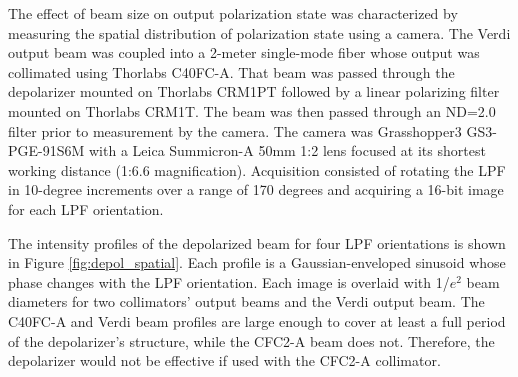 The effect of beam size on output polarization state was characterized by measuring the spatial distribution of polarization state using a camera. The Verdi output beam was coupled into a 2-meter single-mode fiber whose output was collimated using Thorlabs C40FC-A. That beam was passed through the depolarizer mounted on Thorlabs CRM1PT followed by a linear polarizing filter mounted on Thorlabs CRM1T. The beam was then passed through an ND=2.0 filter prior to measurement by the camera. The camera was Grasshopper3 GS3-PGE-91S6M with a Leica Summicron-A 50mm 1:2 lens focused at its shortest working distance (1:6.6 magnification). Acquisition consisted of rotating the LPF in 10-degree increments over a range of 170 degrees and acquiring a 16-bit image for each LPF orientation.

The intensity profiles of the depolarized beam for four LPF orientations is shown in Figure \ref{fig:depol_spatial}. Each profile is a Gaussian-enveloped sinusoid whose phase changes with the LPF orientation. Each image is overlaid with 1/$e^2$ beam diameters for two collimators' output beams and the Verdi output beam. The C40FC-A and Verdi beam profiles are large enough to cover at least a full period of the depolarizer's structure, while the CFC2-A beam does not. Therefore, the depolarizer would not be effective if used with the CFC2-A collimator.
